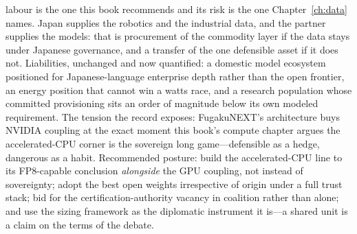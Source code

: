 labour is the one this book recommends and its risk is the one Chapter~\ref{ch:data} names. Japan supplies the robotics and the industrial data, and the partner supplies the models: that is procurement of the commodity layer if the data stays under Japanese governance, and a transfer of the one defensible asset if it does not. Liabilities, unchanged and now quantified: a domestic model ecosystem positioned for Japanese-language enterprise depth rather than the open frontier, an energy position that cannot win a watts race, and a research population whose committed provisioning sits an order of magnitude below its own modeled requirement. The tension the record exposes: FugakuNEXT's architecture buys NVIDIA coupling at the exact moment this book's compute chapter argues the accelerated-CPU corner is the sovereign long game---defensible as a hedge, dangerous as a habit. Recommended posture: build the accelerated-CPU line to its FP8-capable conclusion \emph{alongside} the GPU coupling, not instead of sovereignty; adopt the best open weights irrespective of origin under a full trust stack; bid for the certification-authority vacancy in coalition rather than alone; and use the sizing framework as the diplomatic instrument it is---a shared unit is a claim on the terms of the debate.

